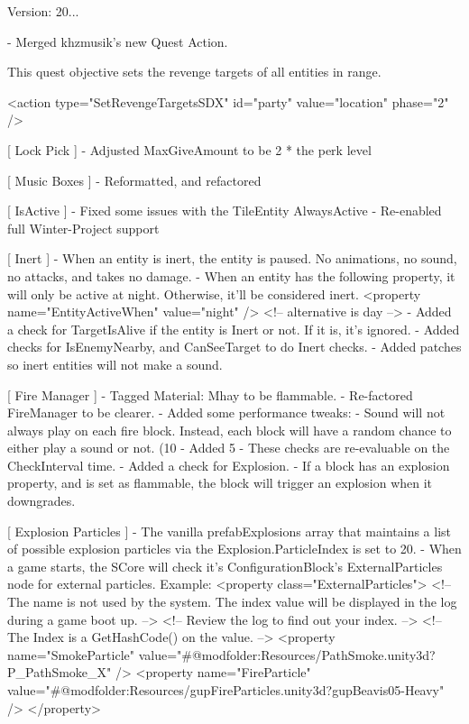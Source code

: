  Version\+: 20... \begin{DoxyVerb}[ Quests ]
    - Merged khzmusik's new Quest Action.

        This quest objective sets the revenge targets of all entities in range.

        <action type="SetRevengeTargetsSDX" id="party" value="location" phase="2" />

[ Lock Pick ]
    - Adjusted MaxGiveAmount to be 2 * the perk level

[ Music Boxes ]
    - Reformatted, and refactored

[ IsActive ]
    - Fixed some issues with the TileEntity AlwaysActive
    - Re-enabled full Winter-Project support

[ Inert ]
    - When an entity is inert, the entity is paused. No animations, no sound, no attacks, and takes no damage.
    - When an entity has the following property, it will only be active at night. Otherwise, it'll be considered inert.
          <property name="EntityActiveWhen" value="night" /> <!-- alternative is day -->
    - Added a check for TargetIsAlive if the entity is Inert or not. If it is, it's ignored.
    - Added checks for IsEnemyNearby, and CanSeeTarget to do Inert checks.
    - Added patches so inert entities will not make a sound.

[ Fire Manager ]
    - Tagged Material: Mhay to be flammable.
    - Re-factored FireManager to be clearer.
    - Added some performance tweaks:
        - Sound will not always play on each fire block. Instead, each block will have a random chance to either play a sound or not. (10%
        - Added 5%
        - These checks are re-evaluable on the CheckInterval time.
    - Added a check for Explosion.
        - If a block has an explosion property, and is set as flammable, the block will trigger an explosion when it downgrades.

[ Explosion Particles ]
    - The vanilla prefabExplosions array that maintains a list of possible explosion particles via the Explosion.ParticleIndex is set to 20.
    - When a game starts, the SCore will check it's ConfigurationBlock's ExternalParticles node for external particles.
        Example:
            <property class="ExternalParticles">
                <!-- The name is not used by the system. The index value will be displayed in the log during a game boot up. -->
                <!-- Review the log to find out your index. -->
                <!-- The Index is a GetHashCode() on the value. -->
                <property name="SmokeParticle" value="#@modfolder:Resources/PathSmoke.unity3d?P_PathSmoke_X" />
                <property name="FireParticle" value="#@modfolder:Resources/gupFireParticles.unity3d?gupBeavis05-Heavy" /> 
            </property>


\end{DoxyVerb}
